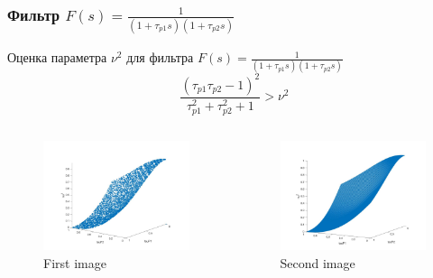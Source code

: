 \documentclass{beamer}
\begin{document}
\begin{frame}
\frametitle{Фильтр $F(s) = \frac{1}{(1+\tau_{p1}s)(1+\tau_{p2}s)}$}
Оценка параметра $\nu^2$ для фильтра $F(s) = \frac{1}{(1+\tau_{p1}s)(1+\tau_{p2}s)}$
\begin{equation*}
\frac{(\tau_{p1}\tau_{p2} - 1)^2}{\tau_{p1}^2 + \tau_{p2}^2 + 1} > \nu^2
\end{equation*} 
\begin{columns}[onlytextwidth]
\begin{column}{.45\textwidth}
\begin{figure}
  \includegraphics[width=\textwidth]{images/filter1e.jpg}
  \caption{First image}
\end{figure}
\end{column}
\hfill
\begin{column}{.45\textwidth}
\begin{figure}
  \includegraphics[width=\textwidth]{images/filter1_1.jpg}
  \caption{Second image}
\end{figure}
\end{column}
\end{columns}
\end{frame}
\end{document}
